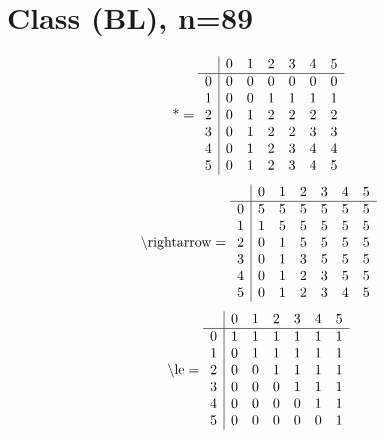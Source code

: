 \documentclass[11pt]{article}
\begin{document}
\section{Class (BL), n=89}
\[\text{*} = 
\begin{array}{r | r r r r r r}
 & 0 & 1 & 2 & 3 & 4 & 5 \\ \hline
0 & 0 & 0 & 0 & 0 & 0 & 0 \\
1 & 0 & 0 & 1 & 1 & 1 & 1 \\
2 & 0 & 1 & 2 & 2 & 2 & 2 \\
3 & 0 & 1 & 2 & 2 & 3 & 3 \\
4 & 0 & 1 & 2 & 3 & 4 & 4 \\
5 & 0 & 1 & 2 & 3 & 4 & 5 \\
\end{array}
\]
\[\text{\textbackslash rightarrow} = 
\begin{array}{r | r r r r r r}
 & 0 & 1 & 2 & 3 & 4 & 5 \\ \hline
0 & 5 & 5 & 5 & 5 & 5 & 5 \\
1 & 1 & 5 & 5 & 5 & 5 & 5 \\
2 & 0 & 1 & 5 & 5 & 5 & 5 \\
3 & 0 & 1 & 3 & 5 & 5 & 5 \\
4 & 0 & 1 & 2 & 3 & 5 & 5 \\
5 & 0 & 1 & 2 & 3 & 4 & 5 \\
\end{array}
\]
\[\text{\textbackslash le} = 
\begin{array}{r | r r r r r r}
 & 0 & 1 & 2 & 3 & 4 & 5 \\ \hline
0 & 1 & 1 & 1 & 1 & 1 & 1 \\
1 & 0 & 1 & 1 & 1 & 1 & 1 \\
2 & 0 & 0 & 1 & 1 & 1 & 1 \\
3 & 0 & 0 & 0 & 1 & 1 & 1 \\
4 & 0 & 0 & 0 & 0 & 1 & 1 \\
5 & 0 & 0 & 0 & 0 & 0 & 1 \\
\end{array}
\]
\end{document}
